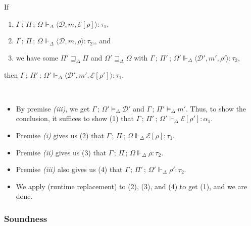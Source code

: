 \documentclass{article}
\newcommand{\mc}[1]{\mathcal{#1}}
\newcommand{\semi}{\,;\,}
\newcommand{\trip}[3]{\langle #1, #2, #3 \rangle}
\newcommand{\rtp}{\tau}
\newcommand{\tmem}[3]{#1 \semi #2 \vDash_\Delta #3}
\newcommand{\tdef}[3]{#1 \semi #2 \vDash_\Delta #3}
\newcommand{\trho}[5]{#1 \semi #2 \semi #3 \Vdash_\Delta #4 : #5}
\newcommand{\tcfg}[7]{#1 \semi #2 \semi #3 \Vdash_\Delta \trip{#4}{#5}{#6} : #7}
\newcommand{\rpodl}{\sqsupseteq_\Delta}
\newcommand{\D}{\mc{D}}
\newcommand{\E}{\mc{E}}
\begin{document}
\begin{lemma}
\label{thm:replcfg}
If \begin{enumerate}[label=(\roman*)]
\item $\tcfg{\Gamma}{\Pi}{\Omega}{\D}{m}{\E[\rho]}{\rtp_1}$,
\item $\tcfg{\Gamma}{\Pi}{\Omega}{\D}{m}{\rho}{\rtp_2}$,, and
\item we have some $\Pi' \rpodl \Pi$ and $\Omega' \rpodl \Omega$
with $\tcfg{\Gamma}{\Pi'}{\Omega'}{\D'}{m'}{\rho'}{\rtp_2}$,
\end{enumerate}
then $\tcfg{\Gamma}{\Pi'}{\Omega'}{\D'}{m'}{\E[\rho']}{\rtp_1}$.

\begin{Proof}\
\begin{itemize}
\item By premise \emph{(iii)}, we get $\tdef{\Gamma}{\Omega'}{\D'}$
and $\tmem{\Gamma}{\Pi'}{m'}$. Thus, to show the conclusion,
it suffices to show (1) that $\trho{\Gamma}{\Pi'}{\Omega'}{\E[\rho']}{\alpha_1}$.
\item Premise \emph{(i)} gives us (2) that
$\trho{\Gamma}{\Pi}{\Omega}{\E[\rho]}{\rtp_1}$.
\item Premise \emph{(ii)} gives us (3) that
$\trho{\Gamma}{\Pi}{\Omega}{\rho}{\rtp_2}$.
\item Premise \emph{(iii)} also gives us (4) that 
$\trho{\Gamma}{\Pi'}{\Omega'}{\rho'}{\rtp_2}$.
\item We apply  (runtime replacement) to (2), (3), and (4)
to get (1), and we are done.
\end{itemize}

\end{Proof}
\end{lemma}

\subsubsection{Soundness}
\end{document}
